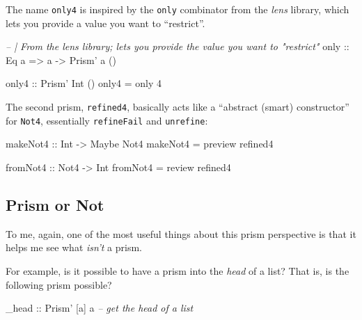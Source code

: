 \documentclass[]{article}
\newenvironment{Shaded}{}{}
\newcommand{\CommentTok}[1]{\textcolor[rgb]{0.38,0.63,0.69}{\textit{#1}}}
\newcommand{\DataTypeTok}[1]{\textcolor[rgb]{0.56,0.13,0.00}{#1}}
\newcommand{\DecValTok}[1]{\textcolor[rgb]{0.25,0.63,0.44}{#1}}
\newcommand{\FunctionTok}[1]{\textcolor[rgb]{0.02,0.16,0.49}{#1}}
\newcommand{\NormalTok}[1]{#1}
\newcommand{\OtherTok}[1]{\textcolor[rgb]{0.00,0.44,0.13}{#1}}
\begin{document}
The name \texttt{only4} is inspired by the \texttt{only} combinator from the
\emph{lens} library, which lets you provide a value you want to ``restrict''.

\begin{Shaded}
\begin{Highlighting}[]
\CommentTok{-- | From the lens library; lets you provide the value you want to "restrict"}
\OtherTok{only ::} \DataTypeTok{Eq}\NormalTok{ a }\OtherTok{=>}\NormalTok{ a }\OtherTok{->} \DataTypeTok{Prism'}\NormalTok{ a ()}

\OtherTok{only4 ::} \DataTypeTok{Prism'} \DataTypeTok{Int}\NormalTok{ ()}
\NormalTok{only4 }\FunctionTok{=}\NormalTok{ only }\DecValTok{4}
\end{Highlighting}
\end{Shaded}

The second prism, \texttt{refined4}, basically acts like a ``abstract (smart)
constructor'' for \texttt{Not4}, essentially \texttt{refineFail} and
\texttt{unrefine}:

\begin{Shaded}
\begin{Highlighting}[]
\OtherTok{makeNot4 ::} \DataTypeTok{Int} \OtherTok{->} \DataTypeTok{Maybe} \DataTypeTok{Not4}
\NormalTok{makeNot4 }\FunctionTok{=}\NormalTok{ preview refined4}

\OtherTok{fromNot4 ::} \DataTypeTok{Not4} \OtherTok{->} \DataTypeTok{Int}
\NormalTok{fromNot4 }\FunctionTok{=}\NormalTok{ review refined4}
\end{Highlighting}
\end{Shaded}

\hypertarget{prism-or-not}{%
\subsection{Prism or Not}\label{prism-or-not}}

To me, again, one of the most useful things about this prism perspective is that
it helps me see what \emph{isn't} a prism.

For example, is it possible to have a prism into the \emph{head} of a list? That
is, is the following prism possible?

\begin{Shaded}
\begin{Highlighting}[]
\OtherTok{_head ::} \DataTypeTok{Prism'}\NormalTok{ [a] a           }\CommentTok{-- get the head of a list}
\end{Highlighting}
\end{Shaded}
\end{document}

